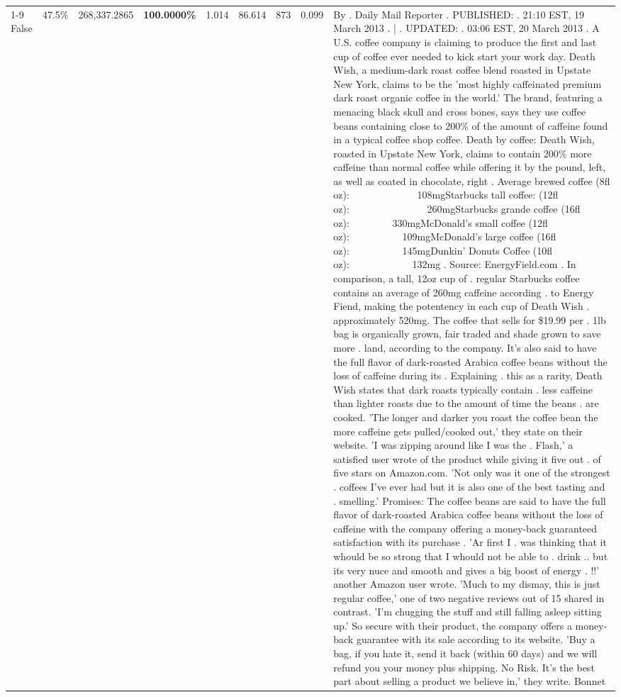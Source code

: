 \begin{table}[H]
{\begin{tabular}{lllrlllll}
\cline{1-9} \cline{2-9}
False & 47.5\% & \color{red} 268,337.2865 & \bfseries \color{red} 100.0000\% & 1.014 & 86.614 & 873 & 0.099 & By . Daily Mail Reporter . PUBLISHED: . 21:10 EST, 19 March 2013 . | . UPDATED: . 03:06 EST, 20 March 2013 . A U.S. coffee company is claiming to produce the first and last cup of coffee ever needed to kick start your work day. Death Wish, a medium-dark roast coffee blend roasted in Upstate New York, claims to be the 'most highly caffeinated premium dark roast organic coffee in the world.' The brand, featuring a menacing black skull and cross bones, says they use coffee beans containing close to 200\% of the amount of caffeine found in a typical coffee shop coffee. Death by coffee: Death Wish, roasted in Upstate New York, claims to contain 200\% more caffeine than normal coffee while offering it by the pound, left, as well as coated in chocolate, right . Average brewed coffee (8fl oz):              108mgStarbucks tall coffee: (12fl oz):                260mgStarbucks grande coffee (16fl oz):         330mgMcDonald's small coffee (12fl oz):           109mgMcDonald's large coffee (16fl oz):           145mgDunkin' Donuts Coffee (10fl oz):             132mg . Source: EnergyField.com . In comparison, a tall, 12oz cup of . regular Starbucks coffee contains an average of 260mg caffeine according . to Energy Fiend, making the potentency in each cup of Death Wish . approximately 520mg. The coffee that sells for \$19.99 per . 1lb bag is organically grown, fair traded and shade grown to save more . land, according to the company. It's also said to have the full flavor of dark-roasted Arabica coffee beans without the loss of caffeine during its . Explaining . this as a rarity, Death Wish states that dark roasts typically contain . less caffeine than lighter roasts due to the amount of time the beans . are cooked. 'The longer and darker you roast the coffee bean the more caffeine gets pulled/cooked out,' they state on their website. 'I was zipping around like I was the . Flash,' a satisfied user wrote of the product while giving it five out . of five stars on Amazon.com. 'Not only was it one of the strongest . coffees I've ever had but it is also one of the best tasting and . smelling.’ Promises: The coffee beans are said to have the full flavor of dark-roasted Arabica coffee beans without the loss of caffeine with the company offering a money-back guaranteed satisfaction with its purchase . 'Ar first I . was thinking that it whould be so strong that I whould not be able to . drink .. but its very nuce and smooth and gives a big boost of energy . !!' another Amazon user wrote. 'Much to my dismay, this is just regular coffee,' one of two negative reviews out of 15 shared in contrast. 'I'm chugging the stuff and still falling asleep sitting up.' So secure with their product, the company offers a money-back guarantee with its sale according to its website. 'Buy a bag, if you hate it, send it back (within 60 days) and we will refund you your money plus shipping. No Risk. It’s the best part about selling a product we believe in,' they write. Bonnet \\

\end{tabular}}
\end{table}
